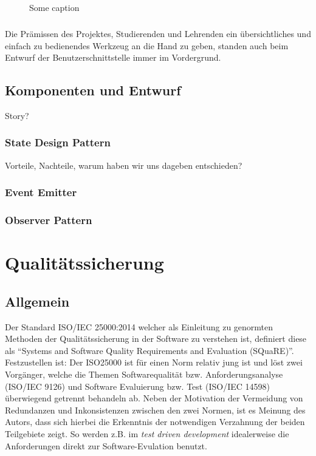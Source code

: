 \begin{figure}[h]
	\centering
	\caption{Some caption}
	\label{UI_final}
\end{figure}

\paragraph{}Die Prämissen des Projektes, Studierenden und Lehrenden ein übersichtliches und einfach zu bedienendes Werkzeug an die Hand zu geben, standen auch beim Entwurf der Benutzerschnittstelle immer im Vordergrund.

\section{Komponenten und Entwurf}
Story? 

\subsection*{State Design Pattern}
Vorteile, Nachteile, warum haben wir uns dageben entschieden?
\subsection*{Event Emitter}
\subsection*{Observer Pattern}


\chapter{Qualitätssicherung}
\label{QS}
\section{Allgemein}
Der Standard ISO/IEC 25000:2014 welcher als Einleitung zu genormten Methoden der Qualitätssicherung in der Software zu verstehen ist, definiert diese als "`Systems and Software Quality Requirements and Evaluation (SQuaRE)"'\cite[Foreword]{ISO25000}. Festzustellen ist: Der ISO25000 ist für einen Norm relativ jung ist und löst zwei Vorgänger, welche die Themen Softwarequalität bzw. Anforderungsanalyse (ISO/IEC 9126) und Software Evaluierung bzw. Test (ISO/IEC 14598) überwiegend getrennt behandeln ab. Neben der Motivation der Vermeidung von Redundanzen und Inkonsistenzen zwischen den zwei Normen, ist es Meinung des Autors, dass sich hierbei die Erkenntnis der notwendigen Verzahnung der beiden Teilgebiete zeigt. So werden z.B. im \textit{test driven development} idealerweise die Anforderungen direkt zur Software-Evulation benutzt.

